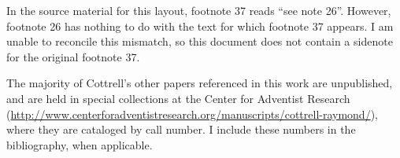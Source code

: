 \begin{fullwidth}
In the source material for this layout, footnote 37 reads ``see note 26''.
However, footnote 26 has nothing to do with the text for which footnote 37
appears.  I am unable to reconcile this
mismatch, so this document does not contain a sidenote for the original
footnote 37.

The majority of Cottrell's other papers referenced in this work are 
unpublished, and are held in special collections at the Center for Adventist
Research (\url{http://www.centerforadventistresearch.org/manuscripts/cottrell-raymond/}),
where they are cataloged by call number. I include these numbers in the 
bibliography, when applicable.
\end{fullwidth}
